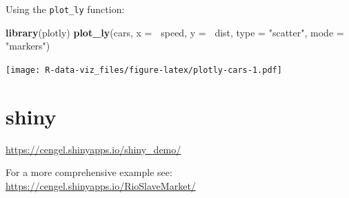 \documentclass[]{book}
\newenvironment{Shaded}{\begin{snugshade}}{\end{snugshade}}
\newcommand{\KeywordTok}[1]{\textcolor[rgb]{0.13,0.29,0.53}{\textbf{#1}}}
\newcommand{\DataTypeTok}[1]{\textcolor[rgb]{0.13,0.29,0.53}{#1}}
\newcommand{\DecValTok}[1]{\textcolor[rgb]{0.00,0.00,0.81}{#1}}
\newcommand{\StringTok}[1]{\textcolor[rgb]{0.31,0.60,0.02}{#1}}
\newcommand{\OperatorTok}[1]{\textcolor[rgb]{0.81,0.36,0.00}{\textbf{#1}}}
\newcommand{\NormalTok}[1]{#1}
\theoremstyle{definition}
\theoremstyle{definition}
\theoremstyle{definition}
\theoremstyle{remark}
\begin{document}
Using the \texttt{plot\_ly} function:

\begin{Shaded}
\begin{Highlighting}[]
\KeywordTok{library}\NormalTok{(plotly)}
\KeywordTok{plot_ly}\NormalTok{(cars, }\DataTypeTok{x =} \OperatorTok{~}\NormalTok{speed, }\DataTypeTok{y =} \OperatorTok{~}\NormalTok{dist, }\DataTypeTok{type =} \StringTok{"scatter"}\NormalTok{, }\DataTypeTok{mode =} \StringTok{"markers"}\NormalTok{)}
\end{Highlighting}
\end{Shaded}

\texttt{[image: R-data-viz\_files/figure-latex/plotly-cars-1.pdf]}

\section{shiny}\label{shiny}

\url{https://cengel.shinyapps.io/shiny_demo/}

\begin{Shaded}
\end{Shaded}

For a more comprehensive example see:
\url{https://cengel.shinyapps.io/RioSlaveMarket/}


\end{document}
